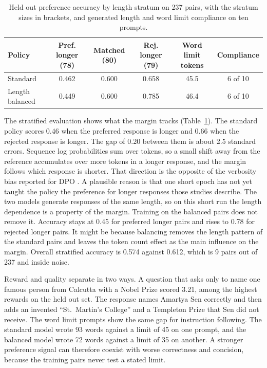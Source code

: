 \documentclass{article}
\begin{document}
\begin{table}[!htb]
  \centering
  \footnotesize
  \begin{tabular}{lccccc}
    \toprule
    Policy & Pref. longer (78) & Matched (80) & Rej. longer (79) & Word limit tokens & Compliance \\
    \midrule
    Standard        & 0.462 & 0.600 & 0.658 & 45.5 & 6 of 10 \\
    Length balanced & 0.449 & 0.600 & 0.785 & 46.4 & 6 of 10 \\
    \bottomrule
  \end{tabular}
  \vspace{8pt}
  \caption{Held out preference accuracy by length stratum on 237 pairs, with
  the stratum sizes in brackets, and generated length and word limit
  compliance on ten prompts.}
  \label{tab:task1-length}
\end{table}

The stratified evaluation shows what the margin tracks (Table~\ref{tab:task1-length}).
The standard policy scores 0.46 when the preferred response is longer
and 0.66 when the rejected response is longer. The gap of 0.20 between them is
about 2.5 standard errors. Sequence log probabilities sum over tokens, so a small
shift away from the reference accumulates over more tokens in a longer response,
and the margin follows which response is shorter. That direction is the opposite
of the verbosity bias reported for DPO
\citep{singhal2023long,park2024disentangling}. A plausible reason is that one
short epoch has not yet taught the policy the preference for longer responses
those studies describe. The two models generate responses
of the same length, so on this short run the length dependence is a property of
the margin. Training on the balanced pairs does not remove it. Accuracy stays at
0.45 for preferred longer pairs and rises to 0.78 for rejected longer pairs. It
might be because balancing removes the length pattern of the standard
pairs and leaves the token count effect as the main influence on the margin.
Overall stratified accuracy is
0.574 against 0.612, which is 9 pairs out of 237 and inside noise.

Reward and quality separate in two ways. A question that asks only to name one
famous person from Calcutta with a Nobel Prize scored 3.21, among the highest
rewards on the held out set. The response names Amartya Sen correctly and then
adds an invented ``St.\ Martin's College'' and a Templeton Prize that Sen did
not receive. The word limit prompts show the same gap for instruction following. The
standard model wrote 93 words against a limit of 45 on one prompt, and the
balanced model wrote 72 words against a limit of 35 on another. A stronger
preference signal can therefore coexist with worse correctness and concision,
because the training pairs never test a stated limit.
\end{document}
